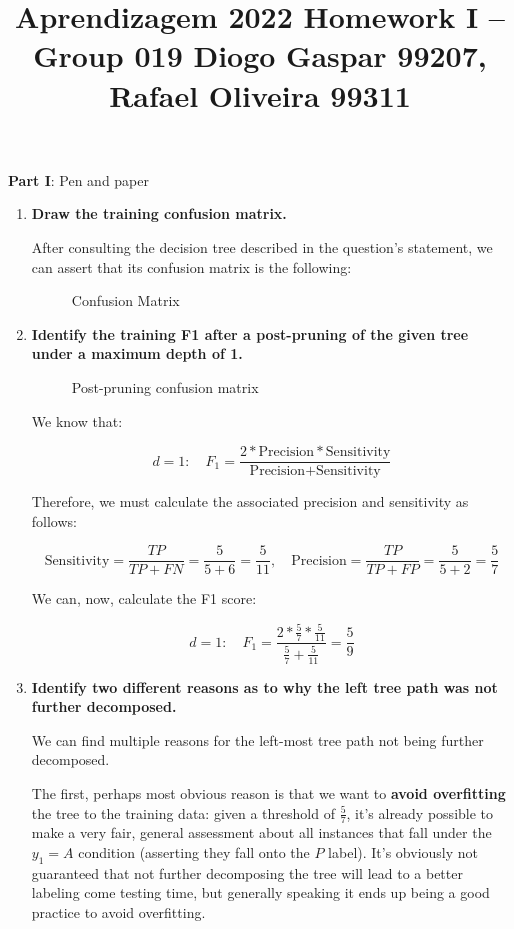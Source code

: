 \documentclass[12pt]{article}
\title{\large{Aprendizagem 2022}\vskip 0.2cm Homework I -- Group 019\vskip 0.2cm Diogo Gaspar 99207, Rafael Oliveira 99311}
\date{}
\begin{document}
\maketitle
\center\large{\vskip -2.5cm\textbf{Part I}: Pen and paper}
\begin{enumerate}[leftmargin=\labelsep]
\item \textbf{Draw the training confusion matrix.}

After consulting the decision tree described in the question's statement,
we can assert that its confusion matrix is the following:

\begin{figure}[htpb]
  \centering
  
  \caption{Confusion Matrix}
\end{figure}

\item \textbf{Identify the training F1 after a post-pruning of the given tree under a maximum depth of 1.}

\begin{figure}[htpb]
\centering

\caption{Post-pruning confusion matrix}
\end{figure}

We know that:

$$
d = 1: \quad F_1 = \frac{2 * \text{Precision} * \text{Sensitivity}}{\text{Precision} + \text{Sensitivity}}
$$

Therefore, we must calculate the associated precision and sensitivity as follows:

$$
\text{Sensitivity} = \frac{TP}{TP + FN} = \frac{5}{5 + 6} = \frac{5}{11}, \quad \text{Precision} = \frac{TP}{TP + FP}= \frac{5}{5 + 2} = \frac{5}{7}
$$

We can, now, calculate the F1 score:

$$
d = 1: \quad F_1 = \frac{2 * \frac{5}{7} * \frac{5}{11}}{\frac{5}{7} + \frac{5}{11}} = \frac{5}{9}
$$

\item \textbf{Identify two different reasons as to why the left tree path was not further decomposed.}

We can find multiple reasons for the left-most tree path not being further decomposed.

The first, perhaps most obvious reason is that we want to \textbf{avoid overfitting} the
tree to the training data: given a threshold of $\frac{5}{7}$, it's already possible
to make a very fair, general assessment about all instances that fall under the $y_1 = A$
condition (asserting they fall onto the $P$ label). It's obviously not guaranteed
that not further decomposing the tree will lead to a better labeling come testing time,
but generally speaking it ends up being a good practice to avoid overfitting.


\end{enumerate}
\end{document}
